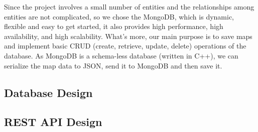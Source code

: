 Since the project involves a small number of entities and the relationships among entities are not complicated, so we chose the MongoDB, which is dynamic, flexible and easy to get started, it also provides high performance, high availability, and high scalability. What's more, our main purpose is to save maps and implement basic CRUD (create, retrieve, update, delete) operations of the database. As MongoDB is a schema-less database (written in C++), we can serialize the map data to JSON, send it to MongoDB and then save it.

\subsection{Database Design}

\subsection{REST API Design}
